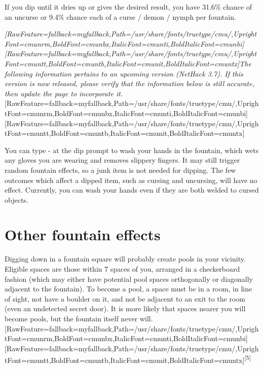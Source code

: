 If you dip until it dries up or gives the desired result, you have 31.6\% chance of an uncurse or 9.4\% chance each of a curse / demon / nymph per fountain.




{\itshape \allowbreak{}\setmainfont{cmunti.ttf}[RawFeature={fallback=myfallback},Path=/usr/share/fonts/truetype/cmu/,UprightFont=cmunrm,BoldFont=cmunbx,ItalicFont=cmunti,BoldItalicFont=cmunbi]\setmonofont{cmunti.ttf}[RawFeature={fallback=myfallback},Path=/usr/share/fonts/truetype/cmu/,UprightFont=cmuntt,BoldFont=cmuntb,ItalicFont=cmunit,BoldItalicFont=cmuntx]\itshape The following information pertains to an upcoming version (NetHack 3.7\footnotemark[72]). If this version is now released, please verify that the information below is still accurate, then update the page to incorporate it.}\allowbreak{}\setmainfont{cmunrm.ttf}[RawFeature={fallback=myfallback},Path=/usr/share/fonts/truetype/cmu/,UprightFont=cmunrm,BoldFont=cmunbx,ItalicFont=cmunti,BoldItalicFont=cmunbi]\setmonofont{cmunrm.ttf}[RawFeature={fallback=myfallback},Path=/usr/share/fonts/truetype/cmu/,UprightFont=cmuntt,BoldFont=cmuntb,ItalicFont=cmunit,BoldItalicFont=cmuntx]



You can type -{} at the dip prompt to wash your hands in the fountain, which wets any gloves you are wearing and removes slippery fingers\footnotemark[73]. It may still trigger random fountain effects, so a junk item is not needed for dipping. The few outcomes which affect a dipped item, such as cursing and uncursing, will have no effect. Currently, you can wash your hands even if they are both welded to cursed objects.
\section{Other fountain effects}
\label{6}
Digging down in a fountain square will probably create pools\footnotemark[74] in your vicinity. Eligible spaces are those within 7 spaces of you, arranged in a checkerboard fashion (which may either have potential pool spaces orthogonally or diagonally adjacent to the fountain). To become a pool, a space must be in a room, in line of sight, not have a boulder on it, and not be adjacent to an exit to the room (even an undetected secret door). It is more likely that spaces nearer you will become pools, but the fountain itself never will.\allowbreak{}\setmainfont{cmunrm.ttf}[RawFeature={fallback=myfallback},Path=/usr/share/fonts/truetype/cmu/,UprightFont=cmunrm,BoldFont=cmunbx,ItalicFont=cmunti,BoldItalicFont=cmunbi]\setmonofont{cmunrm.ttf}[RawFeature={fallback=myfallback},Path=/usr/share/fonts/truetype/cmu/,UprightFont=cmuntt,BoldFont=cmuntb,ItalicFont=cmunit,BoldItalicFont=cmuntx]\textsuperscript{{$\text{[}$}5{$\text{]}$}}


